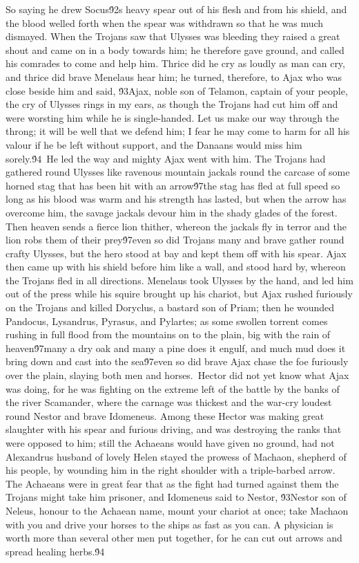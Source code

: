 {So saying he drew Socus\'92s heavy spear out of his flesh and from his shield, and the blood welled forth when the spear was withdrawn so that he was much dismayed. When the Trojans saw that Ulysses was bleeding they raised a great shout and came on in a body towards him; he therefore gave ground, and called his comrades to come and help him. Thrice did he cry as loudly as man can cry, and thrice did brave Menelaus hear him; he turned, therefore, to Ajax who was close beside him and said, \'93Ajax, noble son of Telamon, captain of your people, the cry of Ulysses rings in my ears, as though the Trojans had cut him off and were worsting him while he is single-handed. Let us make our way through the throng; it will be well that we defend him; I fear he may come to harm for all his valour if he be left without support, and the Danaans would miss him sorely.\'94\
He led the way and mighty Ajax went with him. The Trojans had gathered round Ulysses like ravenous mountain jackals round the carcase of some horned stag that has been hit with an arrow\'97the stag has fled at full speed so long as his blood was warm and his strength has lasted, but when the arrow has overcome him, the savage jackals devour him in the shady glades of the forest. Then heaven sends a fierce lion thither, whereon the jackals fly in terror and the lion robs them of their prey\'97even so did Trojans many and brave gather round crafty Ulysses, but the hero stood at bay and kept them off with his spear. Ajax then came up with his shield before him like a wall, and stood hard by, whereon the Trojans fled in all directions. Menelaus took Ulysses by the hand, and led him out of the press while his squire brought up his chariot, but Ajax rushed furiously on the Trojans and killed Doryclus, a bastard son of Priam; then he wounded Pandocus, Lysandrus, Pyrasus, and Pylartes; as some swollen torrent comes rushing in full flood from the mountains on to the plain, big with the rain of heaven\'97many a dry oak and many a pine does it engulf, and much mud does it bring down and cast into the sea\'97even so did brave Ajax chase the foe furiously over the plain, slaying both men and horses.\
Hector did not yet know what Ajax was doing, for he was fighting on the extreme left of the battle by the banks of the river Scamander, where the carnage was thickest and the war-cry loudest round Nestor and brave Idomeneus. Among these Hector was making great slaughter with his spear and furious driving, and was destroying the ranks that were opposed to him; still the Achaeans would have given no ground, had not Alexandrus husband of lovely Helen stayed the prowess of Machaon, shepherd of his people, by wounding him in the right shoulder with a triple-barbed arrow. The Achaeans were in great fear that as the fight had turned against them the Trojans might take him prisoner, and Idomeneus said to Nestor, \'93Nestor son of Neleus, honour to the Achaean name, mount your chariot at once; take Machaon with you and drive your horses to the ships as fast as you can. A physician is worth more than several other men put together, for he can cut out arrows and spread healing herbs.\'94\
}

